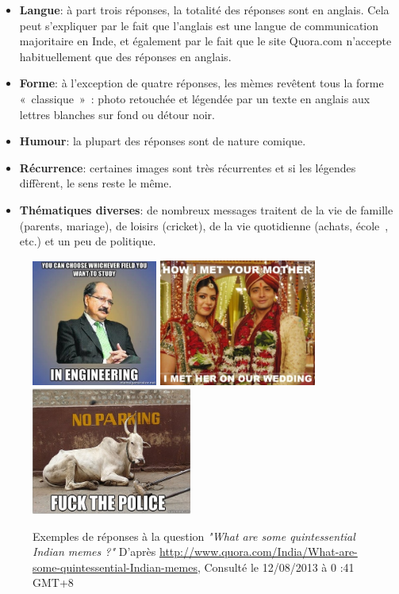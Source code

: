 \begin{itemize}
    \item \textbf{Langue}: à part trois réponses, la totalité des réponses sont en anglais. Cela peut s’expliquer par le fait que l’anglais est une langue de communication majoritaire en Inde, et également par le fait que le site Quora.com n’accepte habituellement que des réponses en anglais.
    \item \textbf{Forme}: à l’exception de quatre réponses, les mèmes revêtent tous la forme « classique » : photo retouchée et légendée par un texte en anglais aux lettres blanches sur fond ou détour noir.
    \item \textbf{Humour}: la plupart des réponses sont de nature comique.
    \item \textbf{Récurrence}: certaines images sont très récurrentes et si les légendes diffèrent, le sens reste le même.
    \item \textbf{Thématiques diverses}: de nombreux messages traitent de la vie de famille (parents, mariage), de loisirs (cricket), de la vie quotidienne (achats, école , etc.) et un peu de politique.
\end{itemize}


\begin{figure}[htp]
    \centering
    \includegraphics[width=1.6224in,height=1.6224in]{figures/chap2/chapitre2-img5.jpg}
    \includegraphics[width=2.0449in,height=1.6335in]{figures/chap2/chapitre2-img6.jpg}
    \includegraphics[width=2.078in,height=1.6449in]{figures/chap2/chapitre2-img7.jpg}
    \caption[Réponses à la question à propos des mèmes indiens sur Quora]{Exemples de réponses à la question \textit{"What are some quintessential Indian memes ?"} D'après \url{http://www.quora.com/India/What-are-some-quintessential-Indian-memes}, Consulté le 12/08/2013 à 0 :41 GMT+8 }
    \label{fig:quora-india}
\end{figure}

